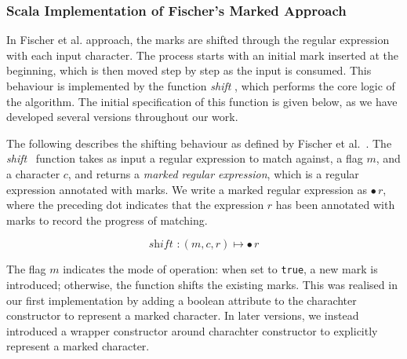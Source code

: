 \documentclass[12pt]{article}
\newcommand{\shift}{\textit{shift }}
\newcommand{\Marked}[1]{\bullet\,#1}
\begin{document}
\subsubsection{Scala Implementation of Fischer’s Marked Approach}

In Fischer et al. approach, the marks are shifted through the regular expression with each input character. 
The process starts with an initial mark inserted at the beginning, which is then moved step by step as the input is consumed. 
This behaviour is implemented by the function \shift, which performs the core logic of the algorithm. 
The initial specification of this function is given below, as we have developed several versions throughout our work.

The following describes the shifting behaviour as defined by Fischer et al.~\cite{Fischer2010}. 
The \shift\ function takes as input a regular expression to match against, 
a flag $m$, and a character $c$, and returns a \emph{marked regular expression}, which is a regular expression annotated with marks. 
We write a marked regular expression as $\bullet\,r$, where the preceding dot indicates that the expression $r$ 
has been annotated with marks to record the progress of matching.  

\[
  \shift : (m, c, r) \mapsto \Marked{r}
\]  

The flag $m$ indicates the mode of operation: when set to \texttt{true}, a new mark is introduced; 
otherwise, the function shifts the existing marks. This was realised in our first implementation 
by adding a boolean attribute to the charachter constructor to represent a marked character. In 
later versions, we instead introduced a wrapper constructor around charachter constructor to 
explicitly represent a marked character.
\end{document}
